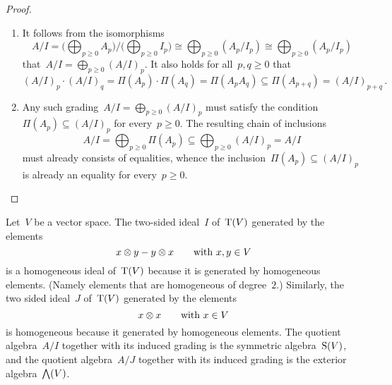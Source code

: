 \begin{proof}
	\leavevmode
	\begin{enumerate}
		\item
			It follows from the isomorphisms
			\[
				A/I
				=
				\Biggl( \bigoplus_{p \geq 0} A_p \Biggr)
				\bigg/
				\Biggl( \bigoplus_{p \geq 0} I_p \Biggr)
				\cong
				\bigoplus_{p \geq 0} {} (A_p / I_p)
				\cong
				\bigoplus_{p \geq 0} {} (A_p / I_p)
			\]
			that~$A/I = \bigoplus_{p \geq 0} {} (A/I)_p$.
			It also holds for all~$p, q \geq 0$ that
			\[
				(A/I)_p \cdot (A/I)_q
				=
				\Pi(A_p) \cdot \Pi(A_q)
				=
				\Pi(A_p A_q)
				\subseteq
				\Pi( A_{p+q} )
				=
				(A/I)_{p+q} \,.
			\]
		\item
			Any such grading~$A/I = \bigoplus_{p \geq 0} {} (A/I)_p$ must satisfy the condition~$\Pi(A_p) \subseteq (A/I)_p$ for every~$p \geq 0$.
			The resulting chain of inclusions
			\[
				A/I
				=
				\bigoplus_{p \geq 0} \Pi(A_p)
				\subseteq
				\bigoplus_{p \geq 0} {} (A/I)_p
				=
				A/I
			\]
			must already consists of equalities, whence the inclusion~$\Pi(A_p) \subseteq (A/I)_p$ is already an equality for every~$p \geq 0$.
		\qedhere
	\end{enumerate}
\end{proof}


\begin{examples}
	Let~$V$ be a vector space.
	The two-sided ideal~$I$ of~$\operatorname{T}(V)$ generated by the elements
	\[
		x \otimes y - y \otimes x
		\qquad
		\text{with~$x, y \in V$}
	\]
	is a homogeneous ideal of~$\operatorname{T}(V)$ because it is generated by homogeneous elements.
	(Namely elements that are homogeneous of degree~$2$.)
	Similarly, the two sided ideal~$J$ of~$\operatorname{T}(V)$ generated by the elements
	\[
		x \otimes x
		\qquad
		\text{with~$x \in V$}
	\]
	is homogeneous because it generated by homogeneous elements.
	The quotient algebra~$A/I$ together with its induced grading is the symmetric algebra~$\operatorname{S}(V)$, and the quotient algebra~$A/J$ together with its induced grading is the exterior algebra~$\operatorname{\bigwedge}(V)$.
\end{examples}


